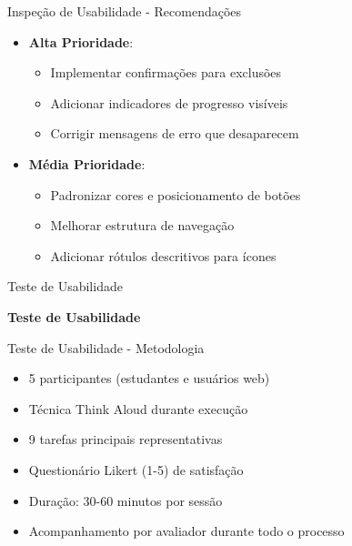 \documentclass[landscape, 12pt]{beamer}
\begin{document}
\begin{frame}{Inspeção de Usabilidade - Recomendações}
    \begin{itemize}
        \item \textbf{Alta Prioridade}:
        \begin{itemize}
            \item Implementar confirmações para exclusões
            \item Adicionar indicadores de progresso visíveis
            \item Corrigir mensagens de erro que desaparecem
        \end{itemize}
        \item \textbf{Média Prioridade}:
        \begin{itemize}
            \item Padronizar cores e posicionamento de botões
            \item Melhorar estrutura de navegação
            \item Adicionar rótulos descritivos para ícones
        \end{itemize}
    \end{itemize}
\end{frame}

\begin{frame}{Teste de Usabilidade}
    \begin{center}
        \textbf{Teste de Usabilidade}
    \end{center}
\end{frame}

\begin{frame}{Teste de Usabilidade - Metodologia}
    \begin{itemize}
        \item 5 participantes (estudantes e usuários web)
        \item Técnica Think Aloud durante execução
        \item 9 tarefas principais representativas
        \item Questionário Likert (1-5) de satisfação
        \item Duração: 30-60 minutos por sessão
        \item Acompanhamento por avaliador durante todo o processo
    \end{itemize}
\end{frame}
\end{document}
